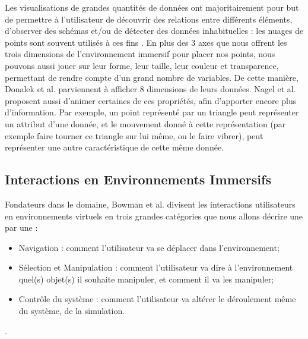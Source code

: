 	 Les visualisations de grandes quantités de données ont majoritairement pour but de permettre à l'utilisateur de découvrir des relations entre différents éléments, d'observer des schémas et/ou de détecter des données inhabituelles : les nuages de points sont souvent utilisés à ces fins \cite{nagel_methods_2001}.
	En plus des 3 axes que nous offrent les trois dimensions de l'environnement immersif pour placer nos points, nous pouvons aussi jouer sur leur forme, leur taille, leur couleur et transparence, permettant de rendre compte d'un grand nombre de variables. De cette manière, Donalek et al. \cite{donalek_immersive_2014} parviennent à afficher 8 dimensions de leurs données. Nagel et al. \cite{nagel_methods_2001} proposent aussi d'animer certaines de ces propriétés, afin d'apporter encore plus d'information. Par exemple, un point représenté par un triangle peut représenter un attribut d'une donnée, et le mouvement donné à cette représentation (par exemple faire tourner ce triangle sur lui même, ou le faire vibrer), peut représenter une autre caractéristique de cette même donnée.
	
	\subsection{Interactions en Environnements Immersifs}
	
	Fondateurs dans le domaine, Bowman et al. \cite{bowman_introduction_2001} divisent les interactions utilisateurs en environnements virtuels en trois grandes catégories que nous allons décrire une par une :
	\begin{itemize}
		\item Navigation : comment l'utilisateur va se déplacer dans l'environnement;
		\item Sélection et Manipulation : comment l'utilisateur va dire à l'environnement quel(s) objet(s) il souhaite manipuler, et comment il va les manipuler;
		\item Contrôle du système : comment l'utilisateur va altérer le déroulement même du système, de la simulation.
	\end{itemize}.
	

